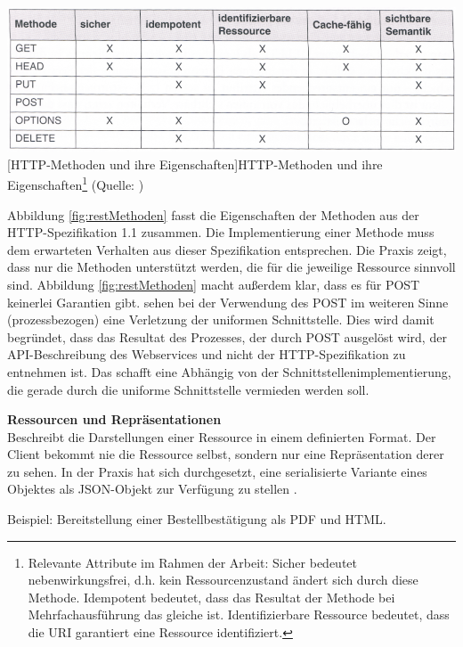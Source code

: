 \documentclass[11pt, a4paper, titlepage, listof=totoc, bibliography=totoc, index=totoc, twoside, openright, headings=normal, draft]{scrreprt}
\begin{document}
\vspace{1em}
\begin{minipage}{\linewidth}
	\centering
	\includegraphics[width=0.7\linewidth]{Abbildungen/restMethoden.png}
	[HTTP-Methoden und ihre Eigenschaften]{HTTP-Methoden und ihre Eigenschaften\footnote{Relevante Attribute im Rahmen der Arbeit: \glqq Sicher\grqq{} bedeutet nebenwirkungsfrei, d.h. kein Ressourcenzustand ändert sich durch diese Methode. \glqq Idempotent\grqq{} bedeutet, dass das Resultat der Methode bei Mehrfachausführung das gleiche ist. \glqq Identifizierbare Ressource\grqq{} bedeutet, dass die URI garantiert eine Ressource identifiziert.}
	(Quelle: \citet{tilkov11})}
	\label{fig:restMethoden}
\end{minipage}
\vspace{1em}

Abbildung \ref{fig:restMethoden} fasst die Eigenschaften der Methoden aus der HTTP-Spezifikation 1.1 zusammen. Die Implementierung einer Methode muss dem erwarteten Verhalten aus dieser Spezifikation entsprechen. Die Praxis zeigt, dass nur die Methoden unterstützt werden, die für die jeweilige Ressource sinnvoll sind. Abbildung \ref{fig:restMethoden} macht außerdem klar, dass es für POST keinerlei Garantien gibt. \citet{richardson07} sehen bei der Verwendung des POST im weiteren Sinne (prozessbezogen) eine Verletzung der uniformen Schnittstelle. Dies wird damit begründet, dass das Resultat des Prozesses, der durch POST ausgelöst wird, der API-Beschreibung des Webservices und nicht der HTTP-Spezifikation zu entnehmen ist. Das schafft eine Abhängig von der Schnittstellenimplementierung, die gerade durch die uniforme Schnittstelle vermieden werden soll.

\textbf{Ressourcen und Repräsentationen}\\
Beschreibt die Darstellungen einer Ressource in einem definierten Format. Der Client bekommt nie die Ressource selbst, sondern nur eine Repräsentation derer zu sehen. In der Praxis hat sich durchgesetzt, eine serialisierte Variante eines Objektes als JSON-Objekt zur Verfügung zu stellen \citep{tilkov11}.

Beispiel: Bereitstellung einer Bestellbestätigung als PDF und HTML.
\end{document}
